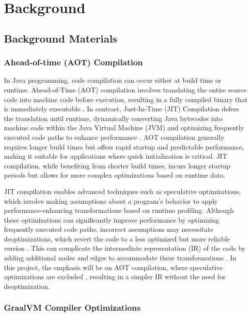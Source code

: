 \chapter[Background and Related Works]{Background}

\section{Background Materials}
\subsection{Ahead-of-time (AOT) Compilation}
In Java programming, code compilation can occur either at build time or runtime. Ahead-of-Time (AOT) compilation involves translating the entire source code into machine code before execution, resulting in a fully compiled binary that is immediately executable \cite{Wade2017}. In contrast, Just-In-Time (JIT) Compilation defers the translation until runtime, dynamically converting Java bytecodes into machine code within the Java Virtual Machine (JVM) and optimizing frequently executed code paths to enhance performance \cite{Wade2017}. AOT compilation generally requires longer build times but offers rapid startup and predictable performance, making it suitable for applications where quick initialization is critical. JIT compilation, while benefiting from shorter build times, incurs longer startup periods but allows for more complex optimizations based on runtime data.

JIT compilation enables advanced techniques such as speculative optimizations, which involve making assumptions about a program’s behavior to apply performance-enhancing transformations based on runtime profiling. Although these optimizations can significantly improve performance by optimizing frequently executed code paths, incorrect assumptions may necessitate deoptimizations, which revert the code to a less optimized but more reliable version \cite{Duboscq2013Inproceedings}. This can complicate the intermediate representation (IR) of the code by adding additional nodes and edges to accommodate these transformations \cite{Duboscq2013Inproceedings}. In this project, the emphasis will be on AOT compilation, where speculative optimizations are excluded \cite{Wimmer2019}, resulting in a simpler IR without the need for deoptimization.

\subsection{GraalVM Compiler Optimizations}

